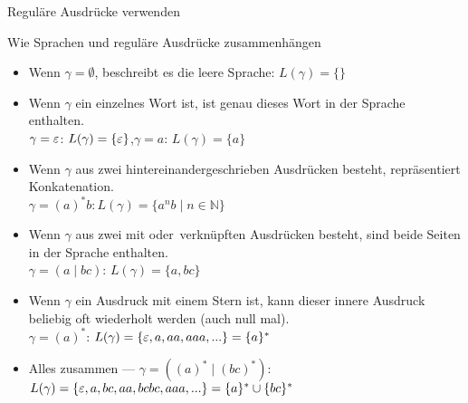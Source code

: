 \begin{frame}{Reguläre Ausdrücke verwenden}
    \begin{exampleblock}{Wie Sprachen und reguläre Ausdrücke zusammenhängen}
    \footnotesize
    \begin{itemize}[<+- | alert@+>]
        \item Wenn $\gamma = \emptyset$, beschreibt es die leere Sprache: $L(\gamma) = \{\}$
        \item Wenn $\gamma$ ein einzelnes Wort ist, ist genau dieses Wort in der Sprache enthalten.\\
        $\gamma = \varepsilon$: $L(\gamma)=\{\varepsilon\}$,\quad$\gamma = a$: $L(\gamma)=\{a\}$
        \item Wenn $\gamma$ aus zwei hintereinandergeschrieben Ausdrücken besteht, repräsentiert Konkatenation.\\
        $\gamma = (a)^*b: L(\gamma)=\{a^nb \mid n \in \mathbb{N}\}$
        \item Wenn $\gamma$ aus zwei mit \glqq oder\grqq\ verknüpften Ausdrücken besteht, sind beide Seiten in der Sprache enthalten.\\
        $\gamma = (a \mid bc)$: $L(\gamma)=\{a, bc\}$
        \item Wenn $\gamma$ ein Ausdruck mit einem Stern ist, kann dieser innere Ausdruck beliebig oft wiederholt werden (auch null mal).\\
        $\gamma = (a)^*$: $L(\gamma)=\{\varepsilon, a, aa, aaa, ...\}=\{a\}^*$
        \item Alles zusammen --- $\gamma = ((a)^* \mid (bc)^*)$: $L(\gamma)=\{\varepsilon, a, bc, aa, bcbc, aaa, ...\} = \{a\}^* \cup \{bc\}^*$
    \end{itemize}
    \end{exampleblock}
\end{frame}

